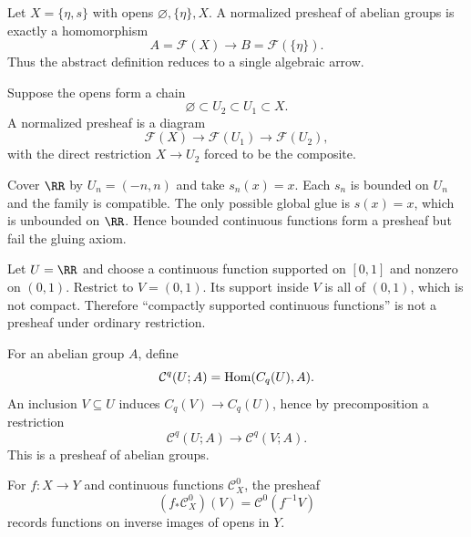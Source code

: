 \begin{example}
Let $X=\{\eta,s\}$ with opens $\varnothing,\{\eta\},X$.  A normalized presheaf of abelian
groups is exactly a homomorphism
\[
A=\mathcal F(X)\longrightarrow B=\mathcal F(\{\eta\}).
\]
Thus the abstract definition reduces to a single algebraic arrow.
\end{example}

\begin{example}
Suppose the opens form a chain
\[
\varnothing\subset U_2\subset U_1\subset X.
\]
A normalized presheaf is a diagram
\[
\mathcal F(X)\longrightarrow\mathcal F(U_1)\longrightarrow\mathcal F(U_2),
\]
with the direct restriction $X\to U_2$ forced to be the composite.
\end{example}

\begin{example}
Cover $\RR$ by $U_n=(-n,n)$ and take $s_n(x)=x$.  Each $s_n$ is bounded on $U_n$ and the
family is compatible.  The only possible global glue is $s(x)=x$, which is unbounded on
$\RR$.  Hence bounded continuous functions form a presheaf but fail the gluing axiom.

\end{example}

\begin{example}
Let $U=\RR$ and choose a continuous function supported on $[0,1]$ and nonzero on $(0,1)$.
Restrict to $V=(0,1)$.  Its support inside $V$ is all of $(0,1)$, which is not compact.
Therefore ``compactly supported continuous functions'' is not a presheaf under ordinary
restriction.
\end{example}

\begin{example}
For an abelian group $A$, define
\[
\mathcal C^q(U;A)=\operatorname{Hom}(C_q(U),A).
\]
An inclusion $V\subseteq U$ induces $C_q(V)\to C_q(U)$, hence by precomposition a restriction
\[
\mathcal C^q(U;A)\longrightarrow\mathcal C^q(V;A).
\]
This is a presheaf of abelian groups.
\end{example}

\begin{example}
For $f:X\to Y$ and continuous functions $\mathcal C^0_X$, the presheaf
\[
(f_*\mathcal C^0_X)(V)=\mathcal C^0(f^{-1}V)
\]
records functions on inverse images of opens in $Y$.
\end{example}

